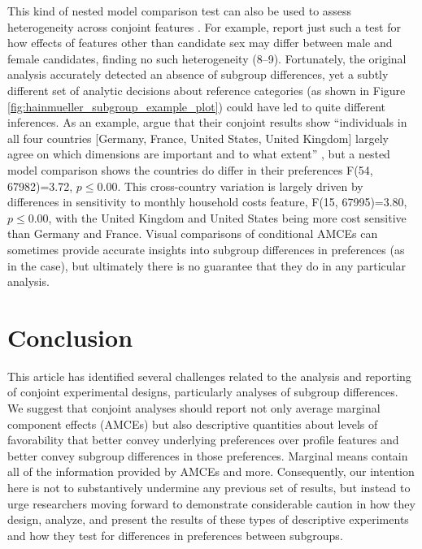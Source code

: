 \documentclass[a4paper,12pt]{article}\usepackage[]{graphicx}\usepackage[]{color}
\begin{document}
This kind of nested model comparison test can also be used to assess heterogeneity across conjoint features \citep[see also][]{EgamiImai2018}. For example, \citet{TeeleKallaRosenbluth2018} report just such a test for how effects of features other than candidate sex may differ between male and female candidates, finding no such heterogeneity (8--9). Fortunately, the original analysis accurately detected an absence of subgroup differences, yet a subtly different set of analytic decisions about reference categories (as shown in Figure \ref{fig:hainmueller_subgroup_example_plot}) could have led to quite different inferences. As an example, \citet{BechtelScheve2013} argue that their conjoint results show ``individuals in all four countries [Germany, France, United States, United Kingdom] largely agree on which dimensions are important and to what extent'' \citep[13765]{BechtelScheve2013}, but a nested model comparison shows the countries do differ in their preferences F(54, 67982)=3.72, $p\leq0.00$. This cross-country variation is largely driven by differences in sensitivity to monthly household costs feature, F(15, 67995)=3.80, $p\leq0.00$, with the United Kingdom and United States being more cost sensitive than Germany and France. Visual comparisons of conditional AMCEs can sometimes provide accurate insights into subgroup differences in preferences (as in the \citeauthor{HainmuellerHopkinsYamamoto2014} case), but ultimately there is no guarantee that they do in any particular analysis.

\section*{Conclusion}\label{sec:conclusion}

This article has identified several challenges related to the analysis and reporting of conjoint experimental designs, particularly analyses of subgroup differences. We suggest that conjoint analyses should report not only average marginal component effects (AMCEs) but also descriptive quantities about levels of favorability that better convey underlying preferences over profile features and better convey subgroup differences in those preferences. Marginal means contain all of the information provided by AMCEs and more. Consequently, our intention here is not to substantively undermine any previous set of results, but instead to urge researchers moving forward to demonstrate considerable caution in how they design, analyze, and present the results of these types of descriptive experiments and how they test for differences in preferences between subgroups.
\end{document}
